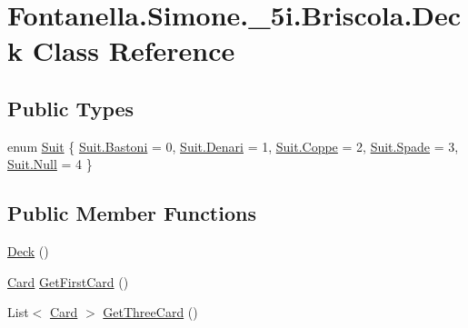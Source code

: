 \hypertarget{class_fontanella_1_1_simone_1_1__5i_1_1_briscola_1_1_deck}{}\section{Fontanella.\+Simone.\+\_\+5i.\+Briscola.\+Deck Class Reference}
\label{class_fontanella_1_1_simone_1_1__5i_1_1_briscola_1_1_deck}
\subsection*{Public Types}
\begin{DoxyCompactItemize}
\item 
enum \hyperlink{class_fontanella_1_1_simone_1_1__5i_1_1_briscola_1_1_deck_a7f82994e5bc71f3c6ab33157e02554ea}{Suit} \{ \newline
\hyperlink{class_fontanella_1_1_simone_1_1__5i_1_1_briscola_1_1_deck_a7f82994e5bc71f3c6ab33157e02554eaa3884d60887f47bb15c2d5fd626ec2ef9}{Suit.\+Bastoni} = 0, 
\hyperlink{class_fontanella_1_1_simone_1_1__5i_1_1_briscola_1_1_deck_a7f82994e5bc71f3c6ab33157e02554eaa51866aba33889f09c8e27b0425d3f5b4}{Suit.\+Denari} = 1, 
\hyperlink{class_fontanella_1_1_simone_1_1__5i_1_1_briscola_1_1_deck_a7f82994e5bc71f3c6ab33157e02554eaa33b40e41b78ca329d4c0c178b4db7649}{Suit.\+Coppe} = 2, 
\hyperlink{class_fontanella_1_1_simone_1_1__5i_1_1_briscola_1_1_deck_a7f82994e5bc71f3c6ab33157e02554eaad3823d5046826424cb0b4f16a4daabcc}{Suit.\+Spade} = 3, 
\newline
\hyperlink{class_fontanella_1_1_simone_1_1__5i_1_1_briscola_1_1_deck_a7f82994e5bc71f3c6ab33157e02554eaabbb93ef26e3c101ff11cdd21cab08a94}{Suit.\+Null} = 4
 \}
\end{DoxyCompactItemize}
\subsection*{Public Member Functions}
\begin{DoxyCompactItemize}
\item 
\hyperlink{class_fontanella_1_1_simone_1_1__5i_1_1_briscola_1_1_deck_a4f65193e53a0190f38af395d126709d4}{Deck} ()
\item 
\hyperlink{class_fontanella_1_1_simone_1_1__5i_1_1_briscola_1_1_card}{Card} \hyperlink{class_fontanella_1_1_simone_1_1__5i_1_1_briscola_1_1_deck_a12d623abbe81c4a10a6e52a82a426591}{Get\+First\+Card} ()
\item 
List$<$ \hyperlink{class_fontanella_1_1_simone_1_1__5i_1_1_briscola_1_1_card}{Card} $>$ \hyperlink{class_fontanella_1_1_simone_1_1__5i_1_1_briscola_1_1_deck_a6f7eeeefb6eb39856f371d3472ab68a6}{Get\+Three\+Card} ()
\end{DoxyCompactItemize}
